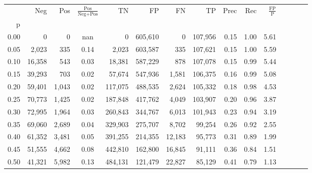 \begin{tabular}{rrrcrrrrrrrrrrr}
\toprule
{} &     Neg &     Pos & $\frac{\text{Pos}}{\text{Neg}+\text{Pos}}$ &       TN &       FP &       FN &       TP &  Prec &   Rec & $\frac{\text{FP}}{\text{P}}$ \\
p    &         &         &                                            &          &          &          &          &       &       &                              \\
\midrule
0.00 &       0 &       0 &                                        nan &        0 &  605,610 &        0 &  107,956 &  0.15 &  1.00 &                         5.61 \\
0.05 &   2,023 &     335 &                                       0.14 &    2,023 &  603,587 &      335 &  107,621 &  0.15 &  1.00 &                         5.59 \\
0.10 &  16,358 &     543 &                                       0.03 &   18,381 &  587,229 &      878 &  107,078 &  0.15 &  0.99 &                         5.44 \\
0.15 &  39,293 &     703 &                                       0.02 &   57,674 &  547,936 &    1,581 &  106,375 &  0.16 &  0.99 &                         5.08 \\
0.20 &  59,401 &   1,043 &                                       0.02 &  117,075 &  488,535 &    2,624 &  105,332 &  0.18 &  0.98 &                         4.53 \\
0.25 &  70,773 &   1,425 &                                       0.02 &  187,848 &  417,762 &    4,049 &  103,907 &  0.20 &  0.96 &                         3.87 \\
0.30 &  72,995 &   1,964 &                                       0.03 &  260,843 &  344,767 &    6,013 &  101,943 &  0.23 &  0.94 &                         3.19 \\
0.35 &  69,060 &   2,689 &                                       0.04 &  329,903 &  275,707 &    8,702 &   99,254 &  0.26 &  0.92 &                         2.55 \\
0.40 &  61,352 &   3,481 &                                       0.05 &  391,255 &  214,355 &   12,183 &   95,773 &  0.31 &  0.89 &                         1.99 \\
0.45 &  51,555 &   4,662 &                                       0.08 &  442,810 &  162,800 &   16,845 &   91,111 &  0.36 &  0.84 &                         1.51 \\
0.50 &  41,321 &   5,982 &                                       0.13 &  484,131 &  121,479 &   22,827 &   85,129 &  0.41 &  0.79 &                         1.13 \\

\end{tabular}
